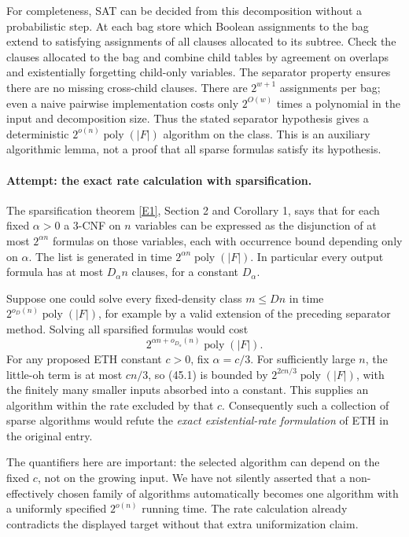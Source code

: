 \documentclass[11pt,a4paper]{article}
\newcommand{\eref}[2]{\hyperlink{extra:#1:#2}{[E#2]}}
\numberwithin{equation}{section}
\begin{document}
For completeness, SAT can be decided from this decomposition without a
probabilistic step. At each bag store which Boolean assignments to the
bag extend to satisfying assignments of all clauses allocated to its
subtree. Check the clauses allocated to the bag and combine child tables
by agreement on overlaps and existentially forgetting child-only
variables. The separator property ensures there are no missing
cross-child clauses. There are $2^{w+1}$ assignments per bag; even a
naive pairwise implementation costs only $2^{O(w)}$ times a polynomial
in the input and decomposition size. Thus the stated separator hypothesis
gives a deterministic $2^{o(n)}\operatorname{poly}(|F|)$ algorithm on the
class. This is an auxiliary algorithmic lemma, not a proof that all
sparse formulas satisfy its hypothesis.

\paragraph{Attempt: the exact rate calculation with sparsification.}
The sparsification theorem \eref{30006694}{1}, Section 2 and Corollary 1,
says that for each fixed $\alpha>0$ a $3$-CNF on $n$ variables can be
expressed as the disjunction of at most $2^{\alpha n}$ formulas on those
variables, each with occurrence bound depending only on $\alpha$.
The list is generated in time $2^{\alpha n}\operatorname{poly}(|F|)$.
In particular every output formula has at most $D_\alpha n$ clauses,
for a constant $D_\alpha$.

Suppose one could solve every fixed-density class $m\le Dn$ in time
$2^{o_D(n)}\operatorname{poly}(|F|)$, for example by a valid extension
of the preceding separator method. Solving all sparsified formulas would
cost
\[
 2^{\alpha n+o_{D_\alpha}(n)}\operatorname{poly}(|F|). \tag{45.1}
\]
For any proposed ETH constant $c>0$, fix $\alpha=c/3$. For sufficiently
large $n$, the little-oh term is at most $cn/3$, so (45.1) is bounded
by $2^{2cn/3}\operatorname{poly}(|F|)$, with the finitely many smaller
inputs absorbed into a constant. This supplies an algorithm within the
rate excluded by that $c$. Consequently such a collection of sparse
algorithms would refute the \emph{exact existential-rate formulation}
of ETH in the original entry.

The quantifiers here are important: the selected algorithm can depend
on the fixed $c$, not on the growing input. We have not silently asserted
that a non-effectively chosen family of algorithms automatically becomes
one algorithm with a uniformly specified $2^{o(n)}$ running time. The
rate calculation already contradicts the displayed target without that
extra uniformization claim.
\end{document}
